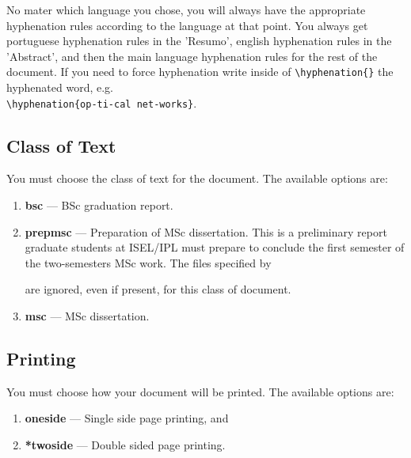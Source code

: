 No mater which language you chose, you will always have the appropriate hyphenation rules according to the language at that point. You always get portuguese hyphenation rules in the 'Resumo', english hyphenation rules in the 'Abstract', and then the main language hyphenation rules for the rest of the document. If you need to force hyphenation write inside of \verb!\hyphenation{}! the hyphenated word, e.g. \\
\verb!\hyphenation{op-ti-cal net-works}!.

\subsection{Class of Text} %
\label{sub:class_of_text}

You must choose the class of text for the document. The available options are:

\begin{enumerate}
	\item \textbf{bsc} --- BSc graduation report.
	\item \textbf{prepmsc} --- Preparation of MSc dissertation. This is a preliminary report graduate students at ISEL/IPL must prepare to conclude the first semester of the two-semesters MSc work. The files specified by 
	are ignored, even if present, for this class of document.
	\item \textbf{msc} --- MSc dissertation.
\end{enumerate}
%
\subsection{Printing} %
\label{sub:printing}

You must choose how your document will be printed. The available options are:

\begin{enumerate}
\item \textbf{oneside} --- Single side page printing, and
\item \textbf{*twoside} --- Double sided page printing.
\end{enumerate}

